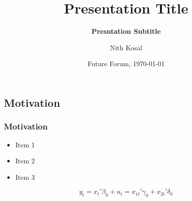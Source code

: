 \documentclass[11pt]{beamer}
\begin{document}
	\author[Nith Kosal]{Nith Kosal}
	\title[Presentation Title]{\bfseries Presentation Title}
	\subtitle{\bfseries Presntation Subtitle}

	
	\date[\today]{Future Forum, \today}

	\begin{frame}[plain]
		\maketitle
		
	\end{frame}
	\setcounter{framenumber}{0}
	\begin{frame}
		\section{Motivation}
		\frametitle{\bfseries Motivation}
		
		\begin{itemize}
			\item Item 1 \citep{Altunbas2001, Bareille2018}
			\item Item 2
			\item Item 3
		\end{itemize}
	\hyperlink{map}{}
	
	\begin{equation}
		y_{t} = x_{t}'\beta_{0} + u_{t} = x_{1t}'\gamma_{0}+x_{2t}'\delta_{0}		
	\end{equation}
	\end{frame}
	
\end{document}
